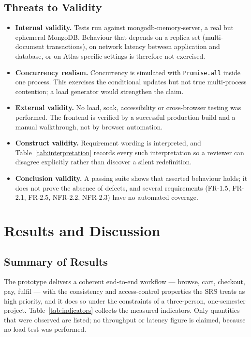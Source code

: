 \documentclass[11pt,a4paper]{article}
\begin{document}
\subsection{Threats to Validity}
\begin{itemize}[leftmargin=1.2em,itemsep=1pt,topsep=2pt]
  \item \textbf{Internal validity.} Tests run against mongodb-memory-server, a real but ephemeral MongoDB. Behaviour that depends on a replica set (multi-document transactions), on network latency between application and database, or on Atlas-specific settings is therefore not exercised.
  \item \textbf{Concurrency realism.} Concurrency is simulated with \texttt{Promise.all} inside one process. This exercises the conditional updates but not true multi-process contention; a load generator would strengthen the claim.
  \item \textbf{External validity.} No load, soak, accessibility or cross-browser testing was performed. The frontend is verified by a successful production build and a manual walkthrough, not by browser automation.
  \item \textbf{Construct validity.} Requirement wording is interpreted, and Table~\ref{tab:interpretation} records every such interpretation so a reviewer can disagree explicitly rather than discover a silent redefinition.
  \item \textbf{Conclusion validity.} A passing suite shows that asserted behaviour holds; it does not prove the absence of defects, and several requirements (FR-1.5, FR-2.1, FR-2.5, NFR-2.2, NFR-2.3) have no automated coverage.
\end{itemize}

\section{Results and Discussion}

\subsection{Summary of Results}
The prototype delivers a coherent end-to-end workflow --- browse, cart, checkout, pay,
fulfil --- with the consistency and access-control properties the SRS treats as high
priority, and it does so under the constraints of a three-person, one-semester project.
Table~\ref{tab:indicators} collects the measured indicators. Only quantities that were
observed are listed; no throughput or latency figure is claimed, because no load test
was performed.
\end{document}
